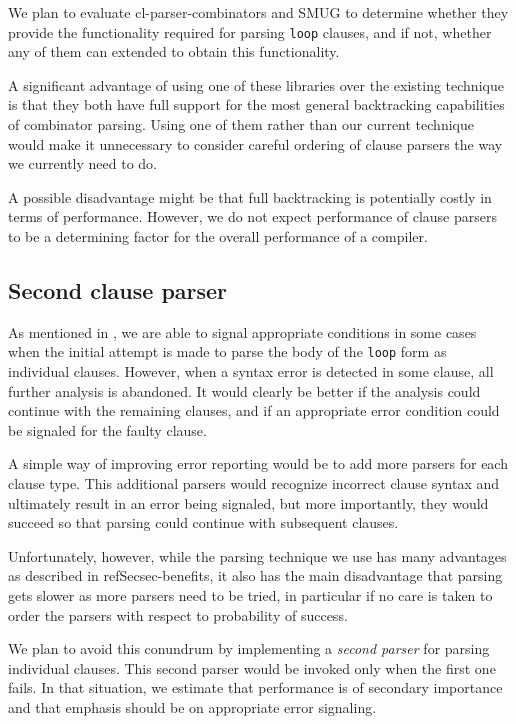 We plan to evaluate cl-parser-combinators and SMUG to determine
whether they provide the functionality required for parsing
\texttt{loop} clauses, and if not, whether any of them can extended to
obtain this functionality.

A significant advantage of using one of these libraries over the
existing technique is that they both have full support for the most
general backtracking capabilities of combinator parsing.  Using one of
them rather than our current technique would make it unnecessary to
consider careful ordering of clause parsers the way we currently need
to do.

A possible disadvantage might be that full backtracking is potentially
costly in terms of performance.  However, we do not expect performance
of clause parsers to be a determining factor for the overall
performance of a \commonlisp{} compiler.

\subsection{Second clause parser}

As mentioned in , we are able to signal
appropriate conditions in some cases when the initial attempt is made
to parse the body of the \texttt{loop} form as individual clauses.
However, when a syntax error is detected in some clause, all further
analysis is abandoned.  It would clearly be better if the analysis
could continue with the remaining clauses, and if an appropriate error
condition could be signaled for the faulty clause.

A simple way of improving error reporting would be to add more parsers
for each clause type.  This additional parsers would recognize
incorrect clause syntax and ultimately result in an error being
signaled, but more importantly, they would succeed so that parsing
could continue with subsequent clauses.

Unfortunately, however, while the parsing technique we use has many
advantages as described in refSec{sec-benefits}, it also has the main
disadvantage that parsing gets slower as more parsers need to be
tried, in particular if no care is taken to order the parsers with
respect to probability of success.

We plan to avoid this conundrum by implementing a \emph{second parser}
for parsing individual clauses.  This second parser would be invoked
only when the first one fails.  In that situation, we estimate that
performance is of secondary importance and that emphasis should be on
appropriate error signaling.

